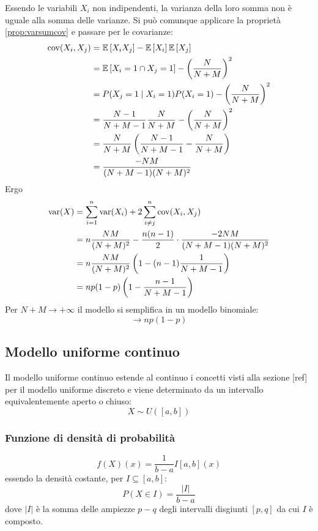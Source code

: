 Essendo le variabili $X_i$ non indipendenti, la varianza della loro somma non è uguale alla somma delle varianze. Si può comunque applicare la proprietà \ref{prop:varsumcov} e passare per le covarianze:
\begin{align*}
	\operatorname{cov}(X_i,X_j) & = \mathbb{E}\left[ X_i X_j \right] - \mathbb{E}\left[ X_i \right]\mathbb{E}\left[ X_j \right]                                \\
	              & = \mathbb{E}\left[ X_i=1\cap X_j=1 \right] - \left(\frac{N}{N+M}\right)^2            \\
	              & = P(X_j=1 \mid X_i=1)P(X_i=1) - \left(\frac{N}{N+M}\right)^2     \\
	              & = \frac{N-1}{N+M-1} \frac{N}{N+M} - \left(\frac{N}{N+M}\right)^2 \\
	              & = \frac{N}{N+M} \left(\frac{N-1}{N+M-1} - \frac{N}{N+M}\right)   \\
	              & = \frac{-NM}{(N+M-1)(N+M)^2}
\end{align*}
Ergo
\begin{align*}
	\operatorname{var}(X) & = \sum_{i=1}^n \operatorname{var}(X_i) + 2\sum_{i\neq j}^n \operatorname{cov}(X_i,X_j)               \\
	        & = n\frac{NM}{(N+M)^2} - \frac{n(n-1)}{2}\cdot\frac{-2NM}{(N+M-1)(N+M)^2} \\
	        & = n\frac{NM}{(N+M)^2}\left(1-(n-1)\frac{1}{N+M-1}\right)                 \\
	        & = np(1-p)\left(1-\frac{n-1}{N+M-1}\right)
\end{align*}
Per $N+M\to+\infty$ il modello si semplifica in un modello binomiale:
\begin{equation*}
	\to np(1-p)
\end{equation*}


\subsection{Modello uniforme continuo}
Il modello uniforme continuo estende al continuo i concetti visti alla sezione [ref{}] per il modello uniforme discreto e viene determinato da un intervallo equivalentemente aperto o chiuso:
\begin{equation*}
	X \sim U([a,b])
\end{equation*}


\subsubsection{Funzione di densità di probabilità}
\begin{equation*}
	f(X)(x) = \frac{1}{b-a} I[a,b](x)
\end{equation*}
essendo la densità costante, per $I\subseteq[a,b]$:
\begin{equation*}
	P(X\in I) = \frac{|I|}{b-a}
\end{equation*}
dove $|I|$ è la somma delle ampiezze $p-q$ degli intervalli disgiunti $[p,q]$ da cui $I$ è composto.

